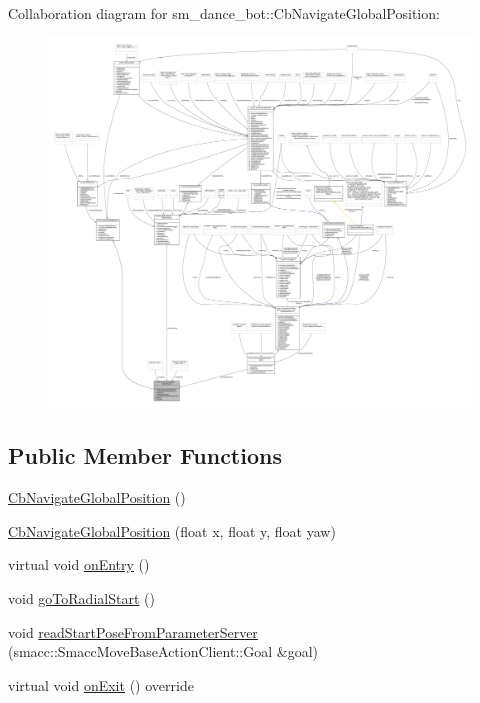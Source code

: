 Collaboration diagram for sm\+\_\+dance\+\_\+bot\+:\+:Cb\+Navigate\+Global\+Position\+:
\nopagebreak
\begin{figure}[H]
\begin{center}
\leavevmode
\includegraphics[width=350pt]{classsm__dance__bot_1_1CbNavigateGlobalPosition__coll__graph}
\end{center}
\end{figure}
\subsection*{Public Member Functions}
\begin{DoxyCompactItemize}
\item 
\hyperlink{classsm__dance__bot_1_1CbNavigateGlobalPosition_a18007aa2d7d814c39361d20c83694997}{Cb\+Navigate\+Global\+Position} ()
\item 
\hyperlink{classsm__dance__bot_1_1CbNavigateGlobalPosition_afec2628e2bf007b1356a3a328ac4f490}{Cb\+Navigate\+Global\+Position} (float x, float y, float yaw)
\item 
virtual void \hyperlink{classsm__dance__bot_1_1CbNavigateGlobalPosition_a281fe5c962ca5004f44e929159991c6a}{on\+Entry} ()
\item 
void \hyperlink{classsm__dance__bot_1_1CbNavigateGlobalPosition_a0832f7a7f205cc483be012aef9501312}{go\+To\+Radial\+Start} ()
\item 
void \hyperlink{classsm__dance__bot_1_1CbNavigateGlobalPosition_aa081de6b798e53e4fd0a4b86e55635b5}{read\+Start\+Pose\+From\+Parameter\+Server} (smacc\+::\+Smacc\+Move\+Base\+Action\+Client\+::\+Goal \&goal)
\item 
virtual void \hyperlink{classsm__dance__bot_1_1CbNavigateGlobalPosition_a63737ce810efefc8c29e6b1b332d2e11}{on\+Exit} () override
\end{DoxyCompactItemize}
